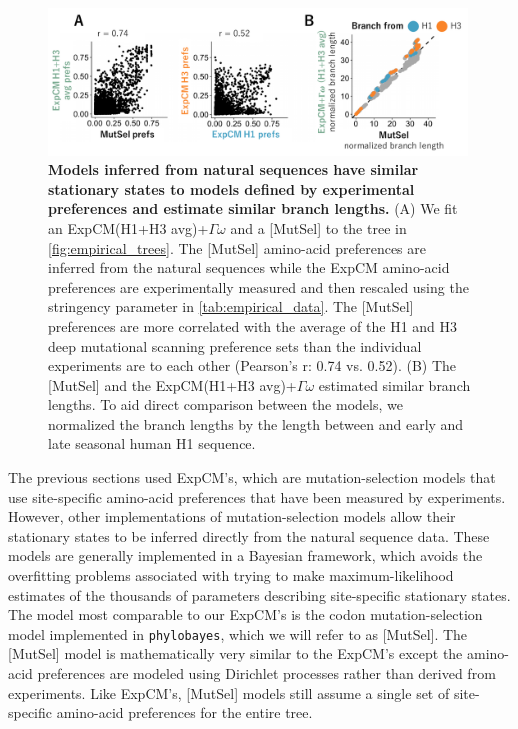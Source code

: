 \documentclass[11pt]{article}
\newcommand\modelName[1]{{\color{magenta}[#1]}}
\begin{document}
\begin{figure}
\centerline{\includegraphics[width=0.99\textwidth]{figures/phylobayes.pdf}}
\caption{\label{fig:phylobayes}
\textbf{Models inferred from natural sequences have similar stationary states to models defined by experimental preferences and estimate similar branch lengths.}
(A) We fit an ExpCM(H1+H3 avg)+$\Gamma\omega$ and a \modelName{MutSel} to the tree in \ref{fig:empirical_trees}. 
The \modelName{MutSel} amino-acid preferences are inferred from the natural sequences while the ExpCM amino-acid preferences are experimentally measured and then rescaled using the stringency parameter in \ref{tab:empirical_data}. 
The \modelName{MutSel} preferences are more correlated with the average of the H1 and H3 deep mutational scanning preference sets than the individual experiments are to each other (Pearson's r: 0.74 vs. 0.52). 
(B) The \modelName{MutSel} and the ExpCM(H1+H3 avg)+$\Gamma\omega$ estimated similar branch lengths. 
To aid direct comparison between the models, we normalized the branch lengths by the length between and early and late seasonal human H1 sequence. 
}
\end{figure}

The previous sections used ExpCM's, which are mutation-selection models that use site-specific amino-acid preferences that have been measured by experiments. 
However, other implementations of mutation-selection models allow their stationary states to be inferred directly from the natural sequence data. 
These models are generally implemented in a Bayesian framework, which avoids the overfitting problems associated with trying to make maximum-likelihood estimates of the thousands of parameters describing site-specific stationary states.
The model most comparable to our ExpCM's is the codon mutation-selection model implemented in \texttt{phylobayes}, which we will refer to as \modelName{MutSel}. 
The \modelName{MutSel} model is mathematically very similar to the ExpCM's except the amino-acid preferences are modeled using Dirichlet processes rather than derived from experiments. 
Like ExpCM's, \modelName{MutSel} models still assume a single set of site-specific amino-acid preferences for the entire tree.
\end{document}
